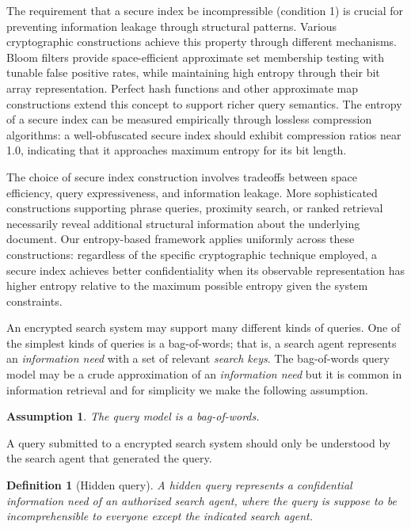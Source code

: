 \documentclass[final,11pt]{article}
\numberwithin{equation}{section}
\theoremstyle{plain}
\newtheorem{definition}{Definition}[section]
\newtheorem{assumption}{Assumption}[section]
\theoremstyle{remark}
\begin{document}
The requirement that a secure index be incompressible (condition 1) is crucial for preventing information leakage through structural patterns. Various cryptographic constructions achieve this property through different mechanisms. Bloom filters\cite{goh2003secure} provide space-efficient approximate set membership testing with tunable false positive rates, while maintaining high entropy through their bit array representation. Perfect hash functions and other approximate map constructions\cite{shmap,pmf} extend this concept to support richer query semantics. The entropy of a secure index can be measured empirically through lossless compression algorithms: a well-obfuscated secure index should exhibit compression ratios near 1.0, indicating that it approaches maximum entropy for its bit length.

The choice of secure index construction involves tradeoffs between space efficiency, query expressiveness, and information leakage. More sophisticated constructions supporting phrase queries, proximity search, or ranked retrieval necessarily reveal additional structural information about the underlying document. Our entropy-based framework applies uniformly across these constructions: regardless of the specific cryptographic technique employed, a secure index achieves better confidentiality when its observable representation has higher entropy relative to the maximum possible entropy given the system constraints.

An encrypted search system may support many different kinds of queries. One of the simplest kinds of queries is a bag-of-words; that is, a search agent represents an \emph{information need} with a set of relevant \emph{search keys}. The bag-of-words query model may be a crude approximation of an \emph{information need} but it is common in information retrieval and for simplicity we make the following assumption.
\begin{assumption}
The query model is a bag-of-words.
\end{assumption}
A query submitted to a encrypted search system should only be understood by the search agent that generated the query.
\begin{definition}[Hidden query]
A hidden query represents a confidential \emph{information need} of an authorized search agent, where the query is suppose to be incomprehensible to everyone except the indicated search agent.
\end{definition}
\end{document}
